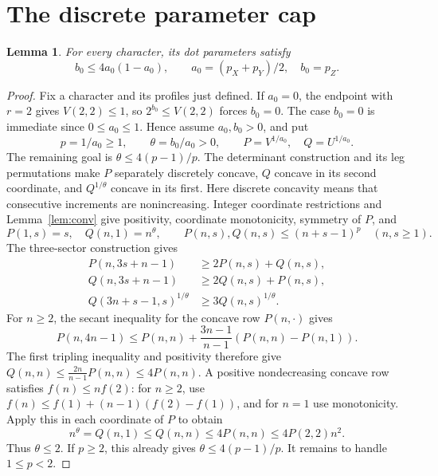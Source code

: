 \documentclass[11pt]{article}
\newtheorem{lemma}[theorem]{Lemma}
\theoremstyle{remark}
\begin{document}
\section{The discrete parameter cap}

\begin{lemma}\label{lem:cap}
For every character, its dot parameters satisfy
\begin{equation}\label{eq:cap}
 b_0\leq4a_0(1-a_0),\qquad a_0=(p_X+p_Y)/2,\quad b_0=p_Z.
\end{equation}
\end{lemma}
\begin{proof}
Fix a character and its profiles just defined. If $a_0=0$, the
endpoint with $r=2$ gives $V(2,2)\leq1$, so $2^{b_0}\leq V(2,2)$
forces $b_0=0$. The case $b_0=0$ is immediate since $0\leq a_0\leq1$.
Hence assume $a_0,b_0>0$, and put
\[
 p=1/a_0\geq1,\qquad \theta=b_0/a_0>0,\qquad
 P=V^{1/a_0},\quad Q=U^{1/a_0}.
\]
The remaining goal is $\theta\leq4(p-1)/p$.
The determinant construction and its leg permutations make $P$
separately discretely concave, $Q$ concave in its second coordinate,
and $Q^{1/\theta}$ concave in its first. Here discrete concavity
means that consecutive increments are nonincreasing. Integer coordinate
restrictions and Lemma~\ref{lem:conv} give positivity, coordinate
monotonicity, symmetry of $P$, and
\[
 P(1,s)=s,\quad Q(n,1)=n^\theta,\qquad
 P(n,s),Q(n,s)\leq(n+s-1)^p\quad(n,s\geq1).
\]
The three-sector construction gives
\begin{align*}
 P(n,3s+n-1)&\geq2P(n,s)+Q(n,s),\\
 Q(n,3s+n-1)&\geq2Q(n,s)+P(n,s),\\
 Q(3n+s-1,s)^{1/\theta}&\geq3Q(n,s)^{1/\theta}.
\end{align*}
For $n\geq2$, the secant inequality for the concave row $P(n,\cdot)$ gives
\[
 P(n,4n-1)\leq P(n,n)+\frac{3n-1}{n-1}
                                (P(n,n)-P(n,1)).
\]
The first tripling inequality and positivity therefore give
$Q(n,n)\leq\frac{2n}{n-1}P(n,n)\leq4P(n,n)$.
A positive nondecreasing concave row satisfies $f(n)\leq nf(2)$: for $n\geq2$,
use $f(n)\leq f(1)+(n-1)(f(2)-f(1))$, and for $n=1$ use
monotonicity. Apply this in each coordinate of $P$ to obtain
\[
 n^\theta=Q(n,1)\leq Q(n,n)\leq4P(n,n)
                      \leq4P(2,2)n^2.
\]
Thus $\theta\leq2$. If $p\geq2$, this already gives
$\theta\leq4(p-1)/p$. It remains to handle $1\leq p<2$.


\end{proof}
\end{document}
